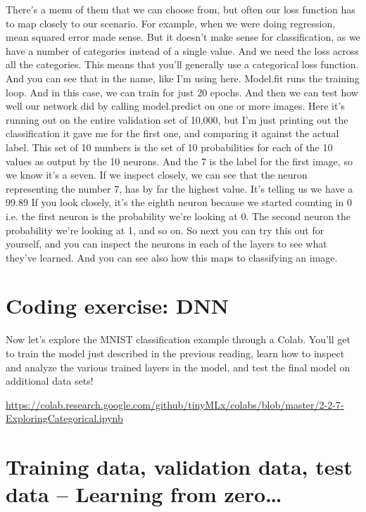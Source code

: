 There's a menu of them that we can choose from,
but often our loss function has to map closely to our scenario.
For example, when we were doing regression,
mean squared error made sense.
But it doesn't make sense for classification,
as we have a number of categories instead of a single value.
And we need the loss across all the categories.
This means that you'll generally use a categorical loss function.
And you can see that in the name, like I'm using here.
Model.fit runs the training loop.
And in this case, we can train for just 20 epochs.
And then we can test how well our network did by calling model.predict
on one or more images.
Here it's running out on the entire validation set of 10,000,
but I'm just printing out the classification
it gave me for the first one, and comparing it against the actual label.
This set of 10 numbers is the set of 10 probabilities for each of the 10
values as output by the 10 neurons.
And the 7 is the label for the first image, so we know it's a seven.
If we inspect closely, we can see that the neuron representing the number 7,
has by far the highest value.
It's telling us we have a 99.89%
If you look closely, it's the eighth neuron
because we started counting in 0 i.e. the first neuron is
the probability we're looking at 0.
The second neuron the probability we're looking at 1, and so on.
So next you can try this out for yourself,
and you can inspect the neurons in each of the layers
to see what they've learned.
And you can see also how this maps to classifying an image.

\section{Coding exercise: DNN}

Now let's explore the MNIST classification example through a Colab. You'll get to train the model just described in the previous reading, learn how to inspect and analyze the various trained layers in the model, and test the final model on additional data sets!

\url{https://colab.research.google.com/github/tinyMLx/colabs/blob/master/2-2-7-ExploringCategorical.ipynb}

\section{Training data, validation data, test data -- Learning from zero\ldots}



